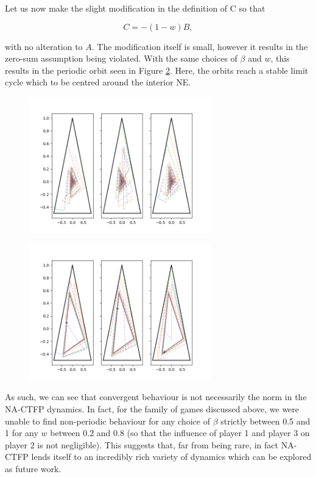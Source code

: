 \documentclass{article}
\theoremstyle{definition}
\begin{document}
	Let us now make the slight modification in the definition of C so that

	\begin{equation}
		C  = - (1 - w) B, 
	\end{equation}

	with no alteration to $A$. The modification itself is small, however it results in the zero-sum assumption being violated. With the same choices of $\beta$ and $w$, this results in the periodic orbit seen in Figure \ref{fig::nonconvergentShapley}. Here, the orbits reach a stable limit cycle which to be centred around the interior NE.

	\begin{figure}[t]
		\centering
		\includegraphics[width = 0.7\textwidth]{Figures/convergentShapley.png}
		\caption{\label{fig::convergentShapley}}
	\end{figure}

	\begin{figure}[t]
		\centering
		\includegraphics[width = 0.7\textwidth]{Figures/nonconvergentShapley.png}
		\caption{\label{fig::nonconvergentShapley}}
	\end{figure}

	As such, we can see that convergent behaviour is not necessarily the norm in the NA-CTFP dynamics. In fact, for the family of games discussed above, we were unable to find non-periodic behaviour for any choice of $\beta$ strictly between 0.5 and 1 for any $w$ between 0.2 and 0.8 (so that the influence of player 1 and player 3 on player 2 is not negligible). This suggests that, far from being rare, in fact NA-CTFP lends itself to an incredibly rich variety of dynamics which can be explored as future work.
	
\end{document}
